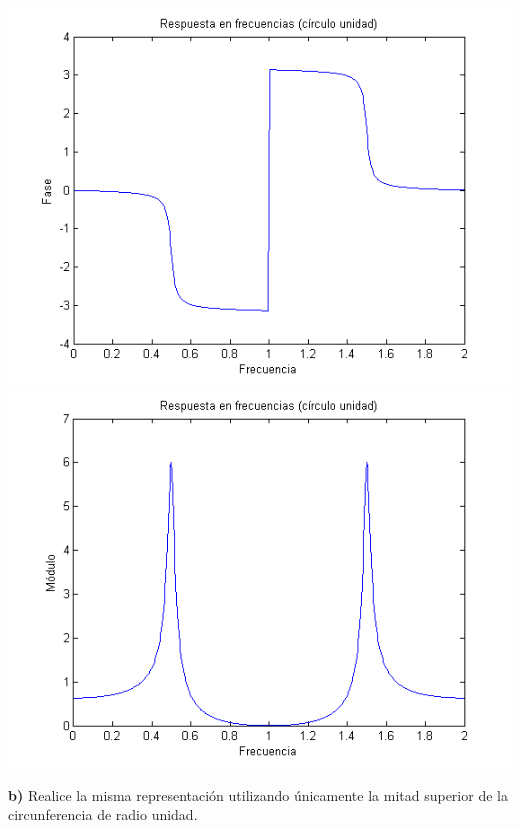 \documentclass[a4paper,12pt]{article}
\begin{document}
\begin{center}
\includegraphics[width=.8 \textwidth]{respuesta-frecuencias-unidad-fase-ejercicio-3.png}
\includegraphics[width=.8 \textwidth]{respuesta-frecuencias-unidad-modulo-ejercicio-3.png}
\end{center}

\textbf{b)} Realice la misma representación utilizando únicamente la mitad superior de la circunferencia de radio unidad. \\
\end{document}
